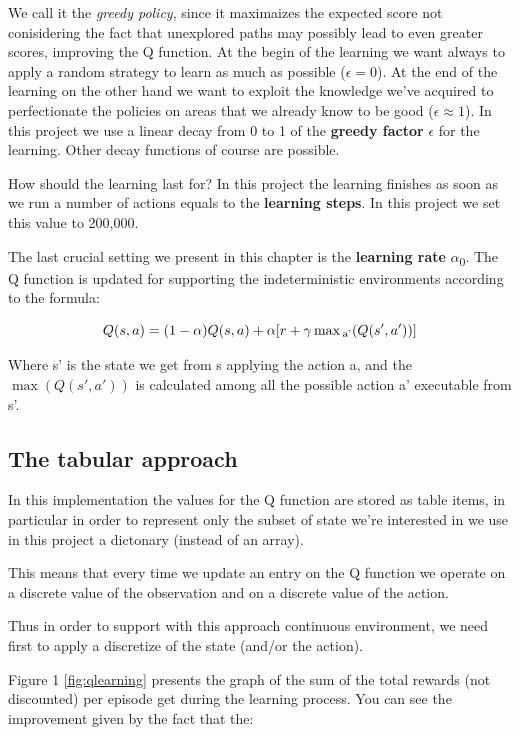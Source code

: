 \documentclass{article}
\begin{document}
We call it the \emph{greedy policy}, since it maximaizes the expected score not conisidering the fact that unexplored paths may
possibly lead to even greater scores, improving the Q function.
At the begin of the learning we want always to apply a random strategy to learn as much as possible ($\epsilon = 0$).
At the end of the learning on the other hand we want to exploit the knowledge we've acquired to perfectionate the policies on areas
that we already know to be good ($\epsilon \approx 1$).
In this project we use a linear decay from 0 to 1 of the \textbf{greedy factor} $\epsilon$ for the learning.
Other decay functions of course are possible.

How should the learning last for? In this project the learning finishes as soon as we run a number of actions
equals to the \textbf{learning steps}. In this project we set this value to 200,000.

The last crucial setting we present in this chapter is the \textbf{learning rate} $\alpha$\textsubscript{0}.
The Q function is updated for supporting the indeterministic environments according to the formula:

\begin{equation}
  Q(s,a) = (1 - \alpha) Q(s,a) + \alpha [r + \gamma \max\textsubscript{a'} (Q(s',a'))]
\end{equation}

Where s' is the state we get from s applying the action a, 
and the $\max (Q(s',a'))$ is calculated among all the possible action a' executable from s'.

\subsection{The tabular approach}

In this implementation the values for the Q function are stored as table items,
in particular in order to represent only the subset of state we're interested in we use 
in this project a dictonary (instead of an array).

This means that every time we update an entry on the Q function we operate on a discrete value of the
observation and on a discrete value of the action.

Thus in order to support with this approach continuous environment,
we need first to apply a discretize of the state (and/or the action).

Figure 1 \ref{fig:qlearning} presents the graph of the sum of the total rewards (not discounted) per episode get during the learning process.
You can see the improvement given by the fact that the:
\end{document}
